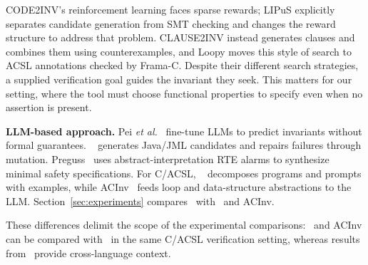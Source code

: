 CODE2INV's reinforcement learning faces sparse rewards; LIPuS explicitly
separates candidate generation from SMT checking and changes the reward
structure to address that problem. CLAUSE2INV instead generates clauses and
combines them using counterexamples, and Loopy moves this style of search to
ACSL annotations checked by Frama-C. Despite their different search
strategies, a supplied verification goal guides the invariant they seek.
This matters for our setting, where the tool must choose functional properties
to specify even when no assertion is present.

\smallskip
\noindent\textbf{LLM-based approach.}
Pei \emph{et al.}~\cite{Can_Large_Language_Models_Reason_About_Program_Invariants} fine-tune LLMs to predict invariants without formal guarantees. \specgen~\cite{SpecGen} generates Java/JML candidates and repairs failures through mutation. Preguss~\cite{Wang2025ATO} uses abstract-interpretation RTE alarms to synthesize minimal safety specifications. For C/ACSL, \autospec~\cite{autospec} decomposes programs and prompts with examples, while ACInv~\cite{Enhancing_Automated_Loop_Invariant_Generation_for_Complex_Programs_with_Large_Language_Models} feeds loop and data-structure abstractions to the LLM. Section~\ref{sec:experiments} compares \toolname\ with \autospec\ and ACInv.

{These differences delimit the scope of the experimental comparisons: \autospec\ and ACInv can be compared with \toolname\ in the same C/ACSL verification setting, whereas results from \specgen\ provide cross-language context.}

